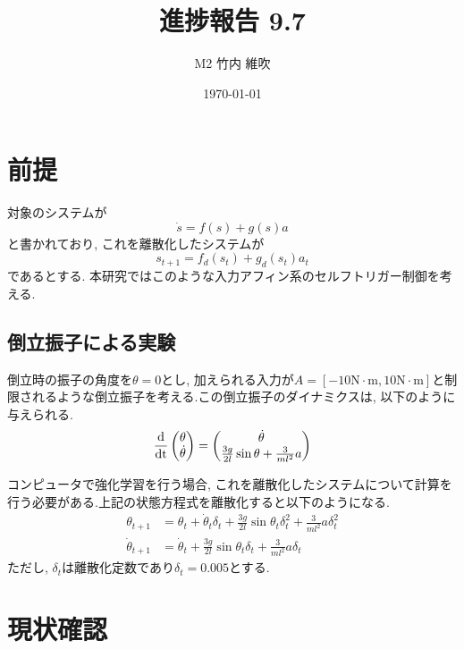 \documentclass{jsarticle}
\title{\large{\bf{進捗報告 9.7}}}
\author{M2 竹内 維吹}
\date{\today}
\newcommand{\odif}[2]{\frac{\rm{d}#1}{\rm{d}#2}}
\begin{document}
\maketitle


\section{前提}
対象のシステムが
\begin{equation}
	\dot{s} = f(s) + g(s)a \label{continuous}
\end{equation}
と書かれており, これを離散化したシステムが
\begin{equation}
	s_{t+1} = f_{d}(s_t) + g_d(s_t)a_t \label{dynamics}
\end{equation}
であるとする. 本研究ではこのような入力アフィン系のセルフトリガー制御を考える. 

\subsection{倒立振子による実験}
倒立時の振子の角度を$\theta=0$とし, 加えられる入力が$A=[-10\textrm{N}\cdot\textrm{m},10\textrm{N}\cdot\textrm{m}]$と制限されるような倒立振子を考える.この倒立振子のダイナミクスは, 以下のように与えられる.
\begin{equation}
	\odif{}{t}\begin{pmatrix}\theta \\ \dot{\theta}\end{pmatrix} = 
		\begin{pmatrix}\dot{\theta} \\ \frac{3g}{2l}\sin{\theta} + \frac{3}{ml^2}a \end{pmatrix} \label{continuous}
\end{equation}

コンピュータで強化学習を行う場合, これを離散化したシステムについて計算を行う必要がある.上記の状態方程式を離散化すると以下のようになる.
\begin{align}
	\theta_{t+1} &= \theta_t+\dot{\theta}_t\delta_t+\frac{3g}{2l}\sin{\theta_t}\delta_t^2+\frac{3}{ml^2}a\delta_t^2 \tag{2a}\\
	\dot{\theta}_{t+1} &=  \dot{\theta}_t+\frac{3g}{2l}\sin{\theta_t}\delta_t+\frac{3}{ml^2}a\delta_t \tag{2b}
\end{align}\label{pend}
\setcounter{equation}{2}
ただし, $\delta_t$は離散化定数であり$\delta_t=0.005$とする.\par


\section{現状確認}
\end{document}
